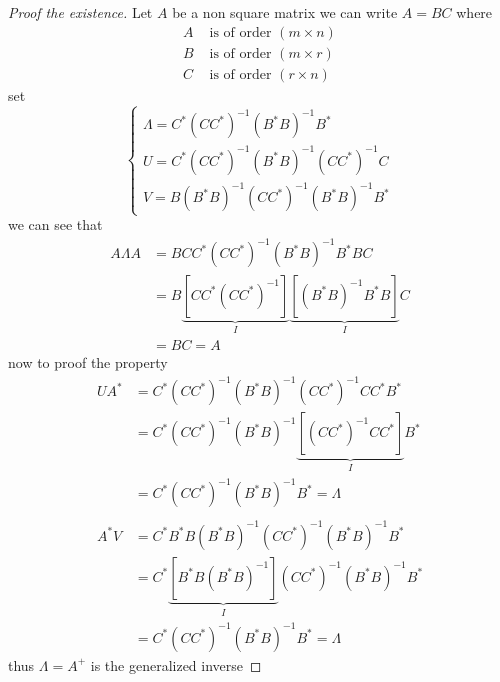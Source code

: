 \documentclass[]{article}
\begin{document}
\begin{proof}[Proof the existence]
Let $A$ be a non square matrix we can write $A = BC$ where
        \begin{align*}
                A &\text{ is of order } (m\times n)
                \\
                B &\text{ is of order } (m\times r)
                \\
                C &\text{ is of order } (r\times n)
        \end{align*}
set
        \begin{equation*}
                \begin{cases}
                        \displaystyle \Lambda = C^{*}(CC^{*})^{-1}(B^{*}B)^{-1}B^{*}
                        \\
                        \displaystyle U = C^{*}(CC^{*})^{-1}(B^{*}B)^{-1}(CC^{*})^{-1}C
                        \\
                        \displaystyle V = B(B^{*}B)^{-1}(CC^{*})^{-1}(B^{*}B)^{-1}B^{*}
                    \end{cases}
        \end{equation*}
we can see that 
        \begin{align*}
                A\Lambda A &= BCC^{*}(CC^{*})^{-1}(B^{*}B)^{-1}B^{*}BC
                \\
                &= B\underbrace{\left[CC^{*}(CC^{*})^{-1}\right]}_{I}\underbrace{\left[(B^{*}B)^{-1}B^{*}B\right]}_{I}C
                \\
                &= BC = A
        \end{align*}
now to proof the property 
\begin{align*}
        UA^* &=  C^{*}(CC^{*})^{-1}(B^{*}B)^{-1}(CC^{*})^{-1}C C^* B^*
        \\
        &=  C^{*}(CC^{*})^{-1}(B^{*}B)^{-1}\underbrace{\left[(CC^{*})^{-1}C C^*\right]}_{I} B^*
        \\
        &= C^{*}(CC^{*})^{-1}(B^{*}B)^{-1}B^* = \Lambda
        \\
        \\
        A^*V &=  C^* B^*B(B^{*}B)^{-1}(CC^{*})^{-1}(B^{*}B)^{-1}B^{*}
        \\
        &=  C^{*}\underbrace{\left[B^*B(B^{*}B)^{-1}\right]}_{I}(CC^{*})^{-1}(B^{*}B)^{-1}B^{*}
        \\
        &= C^{*}(CC^{*})^{-1}(B^{*}B)^{-1}B^* = \Lambda
\end{align*}
thus $\Lambda = A^{+} $ is the generalized inverse
\end{proof}
\end{document}
